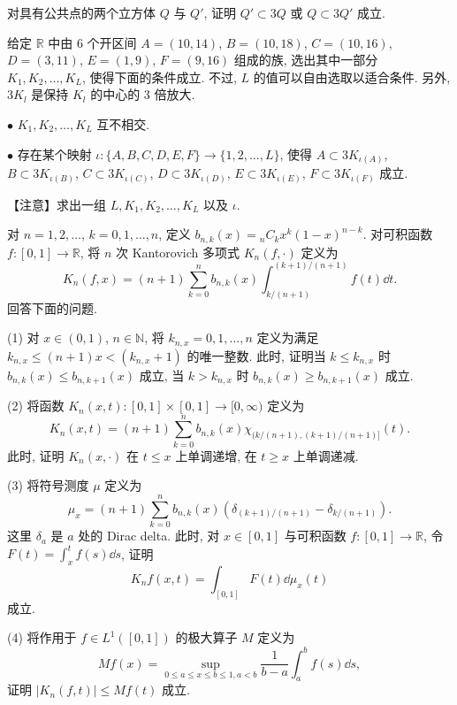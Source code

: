 \begin{exercise}\label{exer:3.3}
对具有公共点的两个立方体 $Q$ 与 $Q'$, 证明 $Q' \subset 3Q$ 或 $Q \subset 3Q'$ 成立.
\end{exercise}

\begin{exercise}\label{exer:3.4}
给定 $\mathbb{R}$ 中由 6 个开区间 $A = (10, 14)$, $B = (10, 18)$, $C = (10, 16)$, $D = (3, 11)$, $E = (1, 9)$, $F = (9, 16)$ 组成的族, 选出其中一部分 $K_{1}, K_{2}, \ldots, K_{L}$, 使得下面的条件成立. 不过, $L$ 的值可以自由选取以适合条件. 另外, $3K_{l}$ 是保持 $K_{l}$ 的中心的 3 倍放大.

$\bullet$ $K_{1}, K_{2}, \ldots, K_{L}$ 互不相交.

$\bullet$ 存在某个映射 $\iota: \{A, B, C, D, E, F\} \to \{1, 2, \ldots, L\}$, 使得 $A \subset 3K_{\iota(A)}$, $B \subset 3K_{\iota(B)}$, $C \subset 3K_{\iota(C)}$, $D \subset 3K_{\iota(D)}$, $E \subset 3K_{\iota(E)}$, $F \subset 3K_{\iota(F)}$ 成立.

【注意】求出一组 $L, K_{1}, K_{2}, \ldots, K_{L}$ 以及 $\iota$.
\end{exercise}

\begin{exercise}\label{exer:3.5}
对 $n = 1, 2, \ldots$, $k = 0, 1, \ldots, n$, 定义 $b_{n,k}(x) = {}_{n}C_{k}x^{k}(1-x)^{n-k}$. 对可积函数 $f: [0,1] \to \mathbb{R}$, 将 $n$ 次 Kantorovich 多项式 $K_{n}(f, \cdot)$ 定义为
\[
K_{n}(f, x) = (n+1)\sum_{k=0}^{n}b_{n,k}(x)\int_{k/(n+1)}^{(k+1)/(n+1)}f(t)\dd t.
\]
回答下面的问题.

(1) 对 $x \in (0,1)$, $n \in \mathbb{N}$, 将 $k_{n,x} = 0, 1, \ldots, n$ 定义为满足 $k_{n,x} \leq (n+1)x < (k_{n,x}+1)$ 的唯一整数. 此时, 证明当 $k \leq k_{n,x}$ 时 $b_{n,k}(x) \leq b_{n,k+1}(x)$ 成立, 当 $k > k_{n,x}$ 时 $b_{n,k}(x) \geq b_{n,k+1}(x)$ 成立.

(2) 将函数 $K_{n}(x, t): [0,1] \times [0,1] \to [0, \infty)$ 定义为
\[
K_{n}(x, t) = (n+1)\sum_{k=0}^{n}b_{n,k}(x)\chi_{(k/(n+1), (k+1)/(n+1)]}(t).
\]
此时, 证明 $K_{n}(x, \cdot)$ 在 $t \leq x$ 上单调递增, 在 $t \geq x$ 上单调递减.

(3) 将符号测度 $\mu$ 定义为
\[
\mu_{x} = (n+1)\sum_{k=0}^{n}b_{n,k}(x)(\delta_{(k+1)/(n+1)} - \delta_{k/(n+1)}).
\]
这里 $\delta_{a}$ 是 $a$ 处的 Dirac delta. 此时, 对 $x \in [0,1]$ 与可积函数 $f: [0,1] \to \mathbb{R}$, 令 $F(t) = \int_{x}^{t}f(s)\dd s$, 证明
\[
K_{n}f(x, t) = \int_{[0,1]}F(t)\dd\mu_{x}(t)
\]
成立.

(4) 将作用于 $f \in L^{1}([0,1])$ 的极大算子 $M$ 定义为
\[
Mf(x) = \sup_{0 \leq a \leq x \leq b \leq 1, a < b}\frac{1}{b-a}\int_{a}^{b}f(s)\dd s,
\]
证明 $|K_{n}(f, t)| \leq Mf(t)$ 成立.
\end{exercise}

